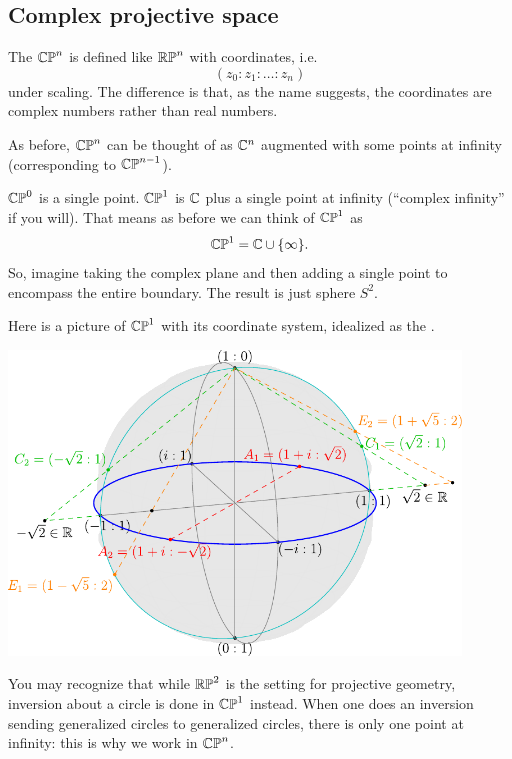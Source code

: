 \subsection*{Complex projective space}
The  $\mathbb{CP}^n$ is
defined like $\mathbb{RP}^n$ with coordinates, i.e.\
\[ (z_0 : z_1 : \dots : z_n) \]
under scaling.
The difference is that, as the name suggests, the coordinates
are complex numbers rather than real numbers.

As before, $\mathbb{CP}^n$ can be thought of as $\mathbb C^n$ augmented
with some points at infinity (corresponding to $\mathbb{CP}^{n-1}$).
\begin{example}
	\listhack
	\begin{enumerate}[(a)]
		\ii $\mathbb{CP}^0$ is a single point.
		\ii $\mathbb{CP}^1$ is $\mathbb C$ plus a single point at infinity
		(``complex infinity'' if you will).
		That means as before we can think of $\mathbb{CP}^1$ as
		\[ \mathbb{CP}^1 = \mathbb C \cup \{\infty\}. \]
		So, imagine taking the complex plane and then adding
		a single point to encompass the entire boundary.
		The result is just sphere $S^2$.
	\end{enumerate}
	Here is a picture of $\mathbb{CP}^1$ with its coordinate system,
	idealized as the .
	\begin{center}
		\includegraphics[width=0.9\textwidth]{media/earth.pdf}
	\end{center}
\end{example}

\begin{remark}
	You may recognize that while $\mathbb{RP}^2$ is the setting for projective geometry,
	inversion about a circle is done in $\mathbb{CP}^1$ instead.
	When one does an inversion sending generalized circles to generalized
	circles, there is only one point at infinity:
	this is why we work in $\mathbb{CP}^n$.
\end{remark}

